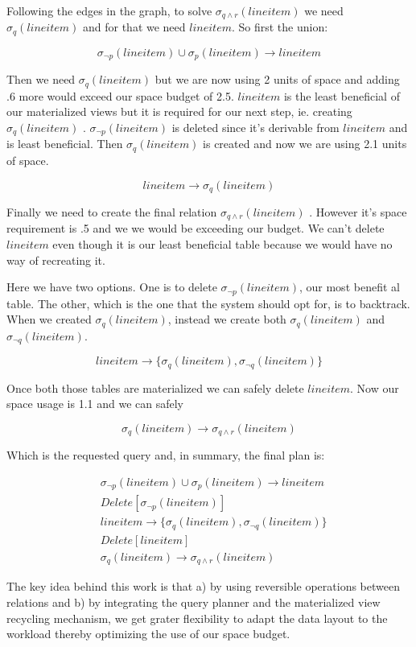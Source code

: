 Following the edges in the graph, to solve \(\sigma_{q \land
  r}(lineitem)\) we need \(\sigma_{q}(lineitem)\) and for that we need
\(lineitem\). So first the union:

\[
  \sigma_{\neg p}(lineitem) \cup \sigma_{p}(lineitem) \rightarrow lineitem
\]

Then we need \(\sigma_{q}(lineitem)\) but we are now using 2 units of
space and adding .6 more would exceed our space budget of
2.5. \(lineitem\) is the least beneficial of our materialized views
but it is required for our next step, ie. creating
\(\sigma_{q}(lineitem)\) . \(\sigma_{\neg p}(lineitem)\) is deleted
since it's derivable from \(lineitem\) and is least beneficial. Then
\(\sigma_{q}(lineitem)\) is created and now we are using 2.1 units of
space.

\[
  lineitem \rightarrow \sigma_{q}(lineitem)
\]

Finally we need to create the final relation \(\sigma_{q \land
  r}(lineitem)\) . However it's space requirement is .5 and we we would
be exceeding our budget. We can't delete \(lineitem\) even though it
is our least beneficial table because we would have no way of
recreating it.

Here we have two options. One is to delete \(\sigma_{\neg
  p}(lineitem)\), our most benefit al table. The other, which is the one
that the system should opt for, is to backtrack. When we created
\(\sigma_{q}(lineitem)\), instead we create both
\(\sigma_{q}(lineitem)\) and \(\sigma_{\neg q}(lineitem)\).

\[
  lineitem \rightarrow \{\sigma_{q}(lineitem), \sigma_{\neg q}(lineitem)\}
\]

Once both those tables are materialized we can safely delete
\(lineitem\). Now our space usage is 1.1 and we can safely

\[
  \sigma_{q}(lineitem) \rightarrow \sigma_{q \land r} (lineitem)
\]

Which is the requested query and, in summary, the final plan is:

\begin{align*}
  &\sigma_{\neg p}(lineitem) \cup \sigma_{p}(lineitem) \rightarrow lineitem \\
  &Delete[\sigma_{\neg p}(lineitem)] \\
  &lineitem \rightarrow \{\sigma_{q}(lineitem), \sigma_{\neg q}(lineitem)\} \\
  &Delete[lineitem] \\
  &\sigma_{q}(lineitem) \rightarrow \sigma_{q \land r} (lineitem)
\end{align*}

The key idea behind this work
is that a) by using reversible operations between relations and b) by
integrating the query planner and the materialized view recycling
mechanism, we get grater flexibility to adapt the data layout to the workload thereby
optimizing the use of our space budget.
